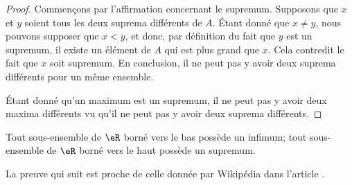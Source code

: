 \begin{proof}
Commençons par l'affirmation concernant le supremum. Supposons que $x$ et $y$ soient tous les deux suprema différents de $A$. Étant donné que $x\neq y$, nous pouvons supposer que $x<y$, et donc, par définition du fait que $y$ est un supremum, il existe un élément de $A$ qui est plus grand que $x$. Cela contredit le fait que $x$ soit supremum. En conclusion, il ne peut pas y avoir deux suprema différents pour un même ensemble.

Étant donné qu'un maximum est un supremum, il ne peut pas y avoir deux maxima différents vu qu'il ne peut pas y avoir deux suprema différents.
\end{proof}

\begin{proposition}		\label{PropBorneSupInf}
	Tout sous-ensemble de $\eR$ borné vers le bas possède un infimum; tout sous-ensemble de $\eR$ borné vers le haut possède un supremum.
\end{proposition}

La preuve qui suit est proche de celle donnée par Wikipédia  dans l'article .

